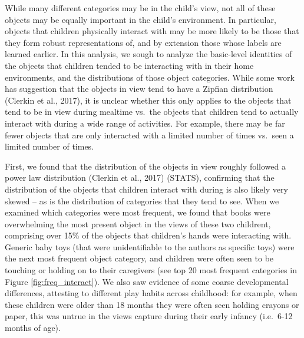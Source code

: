\documentclass[10pt, letterpaper]{article}
\begin{document}
While many different categories may be in the child's view, not all of
these objects may be equally important in the child's environment. In
particular, objects that children physically interact with may be more
likely to be those that they form robust representations of, and by
extension those whose labels are learned earlier. In this analysis, we
sough to analyze the basic-level identities of the objects that children
tended to be interacting with in their home environments, and the
distributions of those object categories. While some work has suggestion
that the objects in view tend to have a Zipfian distribution (Clerkin et
al., 2017), it is unclear whether this only applies to the objects that
tend to be in view during mealtime vs.~the objects that children tend to
actually interact with during a wide range of activities. For example,
there may be far fewer objects that are only interacted with a limited
number of times vs.~seen a limited number of times.

First, we found that the distribution of the objects in view roughly
followed a power law distribution (Clerkin et al., 2017) (STATS),
confirming that the distribution of the objects that children interact
with during is also likely very skewed -- as is the distribution of
categories that they tend to see. When we examined which categories were
most frequent, we found that books were overwhelming the most present
object in the views of these two childrent, comprising over 15\% of the
objects that children's hands were interacting with. Generic baby toys
(that were unidentifiable to the authors as specific toys) were the next
most frequent object category, and children were often seen to be
touching or holding on to their caregivers (see top 20 most frequent
categories in Figure \ref{fig:freq_interact}). We also saw evidence of
some coarse developmental differences, attesting to different play
habits across childhood: for example, when these children were older
than 18 months they were often seen holding crayons or paper, this was
untrue in the views capture during their early infancy (i.e.~6-12 months
of age).
\end{document}

